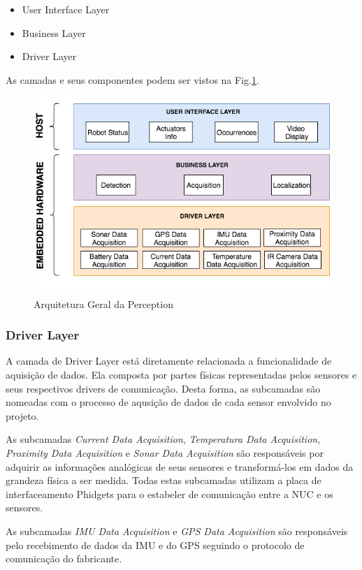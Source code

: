 \begin{itemize}
\item User Interface Layer
\item Business Layer
\item Driver Layer
\end{itemize} 
As camadas e seus componentes podem ser vistos na Fig.\ref{arqsoft}.
\begin{figure}[H]
\centering
\includegraphics[width=15cm]{Figures/ArquiteturadeSoftware.png}
\caption{Arquitetura Geral da Perception}\label{arqsoft}
\end{figure}

\subsubsection{Driver Layer}
A camada de Driver Layer está diretamente relacionada a funcionalidade de aquisição de dados. Ela composta por partes físicas representadas pelos sensores e seus respectivos drivers de comunicação. Desta forma, as subcamadas são nomeadas com o processo de aqusição de dados de cada sensor envolvido no projeto.

As subcamadas \textit{Current Data Acquisition}, \textit{Temperatura Data Acquisition}, \textit{Proximity Data Acquisition} e \textit{Sonar Data Acquisition} são responsáveis por adquirir as informações analógicas de seus sensores e transformá-los em dados da grandeza física a ser medida. Todas estas subcamadas utilizam a placa de interfaceamento Phidgets para o estabeler de comunicação entre a NUC e os sensores.

As subcamadas \textit{IMU Data Acquisition} e \textit{GPS Data Acquisition} são responsáveis pelo recebimento de dados da IMU e do GPS seguindo o protocolo de comunicação do fabricante. 

